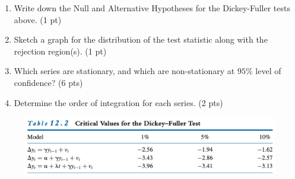 \documentclass[12pt]{article}
\begin{document}
\begin{enumerate}
    \item Write down the Null and Alternative Hypotheses for the Dickey-Fuller tests above. (1 pt)
    \vspace{6cm}
    \item Sketch a graph for the distribution of the test statistic along with the rejection region(s). (1 pt)
    \vspace{6cm}
    \item Which series are stationary, and which are non-stationary at $ 95\% $ level of confidence? (6 pts)
    \vspace{15cm}
    \item Determine the order of integration for each series. (2 pts)
    \vspace{6cm}
\end{enumerate}

\begin{figure}[H]
    \centering
    \includegraphics[width=\linewidth]{fig/critical-values.png}
\end{figure}

\end{document}

